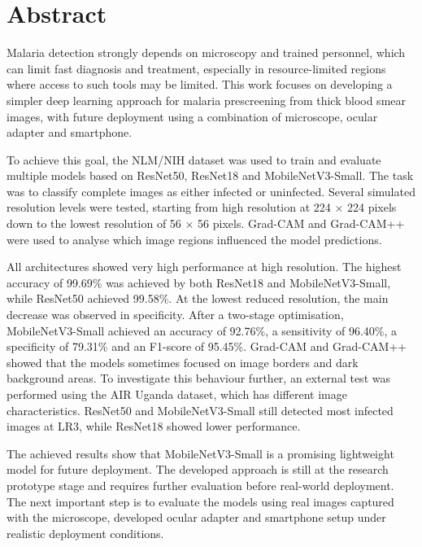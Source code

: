 \chapter*{Abstract}

Malaria detection strongly depends on microscopy and trained personnel, which can limit fast diagnosis and treatment, especially in resource-limited regions where access to such tools may be limited. This work focuses on developing a simpler deep learning approach for malaria prescreening from thick blood smear images, with future deployment using a combination of microscope, ocular adapter and smartphone.

To achieve this goal, the NLM/NIH dataset was used to train and evaluate multiple models based on ResNet50, ResNet18 and MobileNetV3-Small. The task was to classify complete images as either infected or uninfected. Several simulated resolution levels were tested, starting from high resolution at 224 $\times$ 224 pixels down to the lowest resolution of 56 $\times$ 56 pixels. Grad-CAM and Grad-CAM++ were used to analyse which image regions influenced the model predictions.

All architectures showed very high performance at high resolution. The highest accuracy of 99.69\% was achieved by both ResNet18 and MobileNetV3-Small, while ResNet50 achieved 99.58\%. At the lowest reduced resolution, the main decrease was observed in specificity. After a two-stage optimisation, MobileNetV3-Small achieved an accuracy of 92.76\%, a sensitivity of 96.40\%, a specificity of 79.31\% and an F1-score of 95.45\%. Grad-CAM and Grad-CAM++ showed that the models sometimes focused on image borders and dark background areas. To investigate this behaviour further, an external test was performed using the AIR Uganda dataset, which has different image characteristics. ResNet50 and MobileNetV3-Small still detected most infected images at LR3, while ResNet18 showed lower performance.

The achieved results show that MobileNetV3-Small is a promising lightweight model for future deployment. The developed approach is still at the research prototype stage and requires further evaluation before real-world deployment. The next important step is to evaluate the models using real images captured with the microscope, developed ocular adapter and smartphone setup under realistic deployment conditions.
